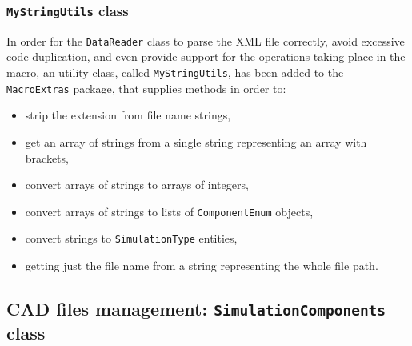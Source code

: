 \subsubsection{\texttt{MyStringUtils} class}

In order for the \lstinline[language=Java]!DataReader! class to parse the XML file correctly, avoid excessive code duplication, and even provide support for the operations taking place in the macro, an utility class, called \lstinline[language=Java]!MyStringUtils!, has been added to the \lstinline[language=Java]!MacroExtras! package, that supplies methods in order to:
%
\begin{itemize}
\item strip the extension from file name strings,
\item get an array of strings from a single string representing an array with brackets,
\item convert arrays of strings to arrays of integers,
\item convert arrays of strings to lists of \lstinline[language=Java]!ComponentEnum! objects,
\item convert strings to \lstinline[language=Java]!SimulationType! entities,
\item getting just the file name from a string representing the whole file path.
\end{itemize}
%

\subsection{CAD files management: \texttt{SimulationComponents} class}
\label{sec4.3.4}

